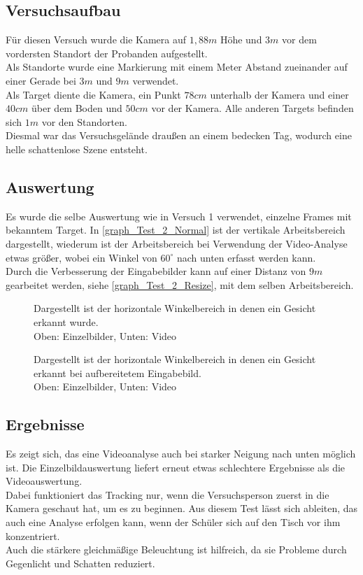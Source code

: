 \subsection{Versuchsaufbau}
Für diesen Versuch wurde die Kamera auf $1,88m$ Höhe und $3m$ vor dem vordersten Standort der Probanden aufgestellt.\\
Als Standorte wurde eine Markierung mit einem Meter Abstand zueinander auf einer Gerade bei $3m$ und $9m$ verwendet.\\
Als Target diente die Kamera, ein Punkt $78cm$ unterhalb der Kamera und einer $40cm$ über dem Boden und $50cm$ vor der Kamera. Alle anderen Targets befinden sich $1m$ vor den Standorten.\\
Diesmal war das Versuchsgelände draußen an einem bedecken Tag, wodurch eine helle schattenlose Szene entsteht.
\subsection{Auswertung}
Es wurde die selbe Auswertung wie in Versuch 1 verwendet, einzelne Frames mit bekanntem Target. In \autoref{graph_Test_2_Normal} ist der vertikale Arbeitsbereich dargestellt, wiederum ist der Arbeitsbereich bei Verwendung der Video-Analyse etwas größer, wobei ein Winkel von $60^\circ$ nach unten erfasst werden kann.\\
Durch die Verbesserung der Eingabebilder kann auf einer Distanz von $9m$ gearbeitet werden, siehe \autoref{graph_Test_2_Resize}, mit dem selben Arbeitsbereich.
\begin{figure}
	\centering
		
	\caption{Dargestellt ist der horizontale Winkelbereich in denen ein Gesicht erkannt wurde.\\
		Oben: Einzelbilder, Unten: Video}
	\label{graph_Test_2_Normal}
\end{figure}
\begin{figure}
\centering
	
	\caption{Dargestellt ist der horizontale Winkelbereich in denen ein Gesicht erkannt bei aufbereitetem Eingabebild.\\
	Oben: Einzelbilder, Unten: Video}
\label{graph_Test_2_Resize}
\end{figure}
\subsection{Ergebnisse}
Es zeigt sich, das eine Videoanalyse auch bei starker Neigung nach unten möglich ist. Die Einzelbildauswertung liefert erneut etwas schlechtere Ergebnisse als die Videoauswertung.\\
Dabei funktioniert das Tracking nur, wenn die Versuchsperson zuerst in die Kamera geschaut hat, um es zu beginnen. Aus diesem Test lässt sich ableiten, das auch eine Analyse erfolgen kann, wenn der Schüler sich auf den Tisch vor ihm konzentriert.\\
Auch die stärkere gleichmäßige Beleuchtung ist hilfreich, da sie Probleme durch Gegenlicht und Schatten reduziert.
